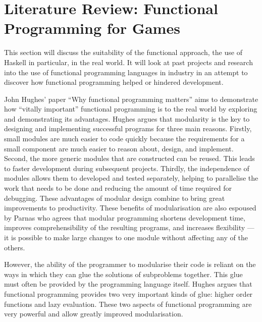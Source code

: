 \section{Literature Review: Functional Programming for Games}
\label{sec:fp_review}

\label{cf:code_organisation} %


This section will discuss the suitability of the functional approach, the use
of Haskell in particular, in the real world. It will look at past projects and
research into the use of functional programming languages in industry in an
attempt to discover how functional programming helped or hindered development.

John Hughes' paper ``Why functional programming matters'' aims to demonstrate how
``vitally important'' functional programming is to the real world by exploring and
demonstrating its advantages.\cite{hughes1989whyfp} Hughes argues that modularity
is the key to designing and implementing successful programs for three main reasons.
Firstly, small modules are much easier to code quickly because the requirements for
a small component are much easier to reason about, design, and implement. Second,
the more generic modules that are constructed can be reused. This leads to faster
development during subsequent projects. Thirdly, the independence of modules allows
them to developed and tested separately, helping to parallelise the work that needs
to be done and reducing the amount of time required for debugging. These advantages
of modular design combine to bring great improvements to productivity. These benefits
of modularisation are also espoused by Parnas who agrees that modular programming
shortens development time, improves comprehensibility of the resulting programs,
and increases flexibility --- it is possible to make large changes to one module
without affecting any of the others.\cite{parnas1972modular}

However, the ability of the programmer to modularise their code is reliant on the
ways in which they can glue the solutions of subproblems together. This glue must
often be provided by the programming language itself. Hughes argues that functional
programming provides two very important kinds of glue: higher order functions
and lazy evaluation. These two aspects of functional programming are very powerful
and allow greatly improved modularisation.

